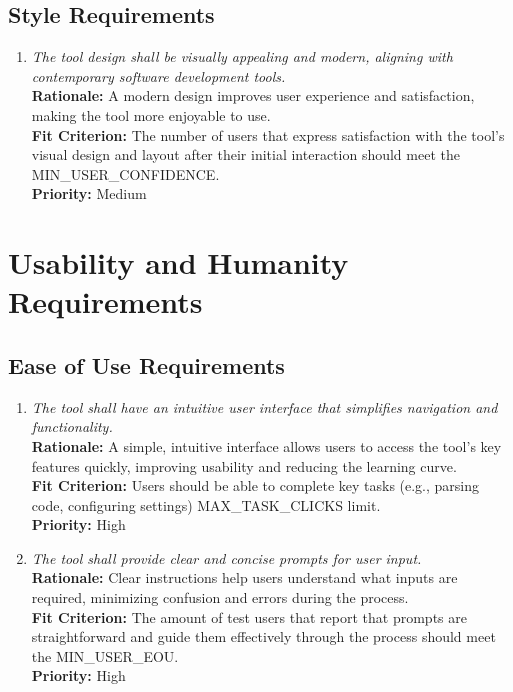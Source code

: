 \documentclass[12pt]{article}
\begin{document}
\subsection{Style Requirements}
\begin{enumerate}[label=LFR-ST \arabic*., wide=0pt, leftmargin=*]
  \item \emph{The tool design shall be visually appealing and modern,
    aligning with contemporary software development tools.}\\[2mm]
    {\bf Rationale:} A modern design improves user experience and
    satisfaction, making the tool more enjoyable to use.\\
    {\bf Fit Criterion:} The number of users that express
    satisfaction with the tool's visual design and layout after their
    initial interaction should meet the MIN\_USER\_CONFIDENCE.\\
    {\bf Priority:} Medium
\end{enumerate}

\section{Usability and Humanity Requirements}
\subsection{Ease of Use Requirements}
\begin{enumerate}[label=UHR-EOU \arabic*., wide=0pt, leftmargin=*]
  \item \emph{The tool shall have an intuitive user interface that
    simplifies navigation and functionality.}\\[2mm]
    {\bf Rationale:} A simple, intuitive interface allows users to
    access the tool's key features quickly, improving usability and
    reducing the learning curve.\\
    {\bf Fit Criterion:} Users should be able to complete key tasks
    (e.g., parsing code, configuring settings) MAX\_TASK\_CLICKS limit.\\
    {\bf Priority:} High
  \item \emph{The tool shall provide clear and concise prompts for
    user input.}\\[2mm]
    {\bf Rationale:} Clear instructions help users understand what
    inputs are required, minimizing confusion and errors during the process.\\
    {\bf Fit Criterion:} The amount of test users that report that
    prompts are straightforward and guide them effectively through
    the process should meet the MIN\_USER\_EOU.\\
    {\bf Priority:} High
\end{enumerate}
\end{document}

